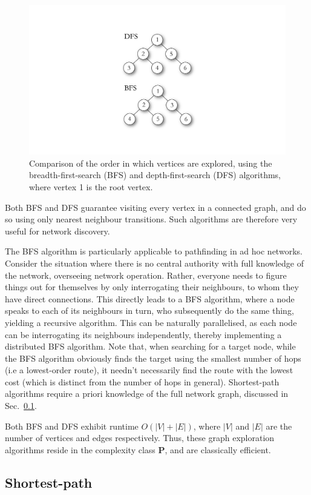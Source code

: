 \documentclass[aps,rmp,twocolumn,amsmath,amssymb,nofootinbib,superscriptaddress,longbibliography,floatfix,table-of-contents,eqsecnum]{revtex4-1}
\begin{document}
\begin{figure}[!htb]
\includegraphics[width=0.6\columnwidth]{BFS_DFS}
\caption{Comparison of the order in which vertices are explored, using the breadth-first-search (BFS) and depth-first-search (DFS) algorithms, where vertex 1 is the root vertex.} \label{fig:BFS_DFS}
\end{figure}

Both BFS and DFS guarantee visiting every vertex in a connected graph, and do so using only nearest neighbour transitions. Such algorithms are therefore very useful for network discovery.

The BFS algorithm is particularly applicable to pathfinding in ad hoc networks. Consider the situation where there is no central authority with full knowledge of the network, overseeing network operation. Rather, everyone needs to figure things out for themselves by only interrogating their neighbours, to whom they have direct connections. This directly leads to a BFS algorithm, where a node speaks to each of its neighbours in turn, who subsequently do the same thing, yielding a recursive algorithm. This can be naturally parallelised, as each node can be interrogating its neighbours independently, thereby implementing a distributed BFS algorithm. Note that, when searching for a target node, while the BFS algorithm obviously finds the target using the smallest number of hops (i.e a lowest-order route), it needn't necessarily find the route with the lowest cost (which is distinct from the number of hops in general). Shortest-path algorithms require a priori knowledge of the full network graph, discussed in Sec.~\ref{sec:shortest_path}.

Both BFS and DFS exhibit runtime \mbox{$O(|V|+|E|)$}, where $|V|$ and $|E|$ are the number of vertices and edges respectively. Thus, these graph exploration algorithms reside in the complexity class \textbf{P}, and are classically efficient.

%
%

\subsection{Shortest-path} \label{sec:shortest_path} 
\end{document}
